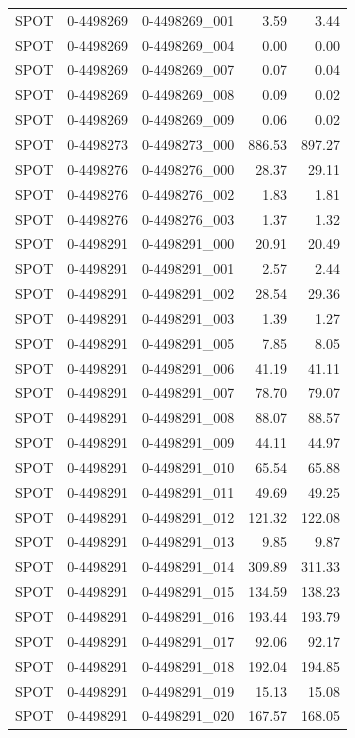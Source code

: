 \begin{tabular}{lllrr}
SPOT & 0-4498269 & 0-4498269_001 & 3.59 & 3.44 \\
SPOT & 0-4498269 & 0-4498269_004 & 0.00 & 0.00 \\
SPOT & 0-4498269 & 0-4498269_007 & 0.07 & 0.04 \\
SPOT & 0-4498269 & 0-4498269_008 & 0.09 & 0.02 \\
SPOT & 0-4498269 & 0-4498269_009 & 0.06 & 0.02 \\
SPOT & 0-4498273 & 0-4498273_000 & 886.53 & 897.27 \\
SPOT & 0-4498276 & 0-4498276_000 & 28.37 & 29.11 \\
SPOT & 0-4498276 & 0-4498276_002 & 1.83 & 1.81 \\
SPOT & 0-4498276 & 0-4498276_003 & 1.37 & 1.32 \\
SPOT & 0-4498291 & 0-4498291_000 & 20.91 & 20.49 \\
SPOT & 0-4498291 & 0-4498291_001 & 2.57 & 2.44 \\
SPOT & 0-4498291 & 0-4498291_002 & 28.54 & 29.36 \\
SPOT & 0-4498291 & 0-4498291_003 & 1.39 & 1.27 \\
SPOT & 0-4498291 & 0-4498291_005 & 7.85 & 8.05 \\
SPOT & 0-4498291 & 0-4498291_006 & 41.19 & 41.11 \\
SPOT & 0-4498291 & 0-4498291_007 & 78.70 & 79.07 \\
SPOT & 0-4498291 & 0-4498291_008 & 88.07 & 88.57 \\
SPOT & 0-4498291 & 0-4498291_009 & 44.11 & 44.97 \\
SPOT & 0-4498291 & 0-4498291_010 & 65.54 & 65.88 \\
SPOT & 0-4498291 & 0-4498291_011 & 49.69 & 49.25 \\
SPOT & 0-4498291 & 0-4498291_012 & 121.32 & 122.08 \\
SPOT & 0-4498291 & 0-4498291_013 & 9.85 & 9.87 \\
SPOT & 0-4498291 & 0-4498291_014 & 309.89 & 311.33 \\
SPOT & 0-4498291 & 0-4498291_015 & 134.59 & 138.23 \\
SPOT & 0-4498291 & 0-4498291_016 & 193.44 & 193.79 \\
SPOT & 0-4498291 & 0-4498291_017 & 92.06 & 92.17 \\
SPOT & 0-4498291 & 0-4498291_018 & 192.04 & 194.85 \\
SPOT & 0-4498291 & 0-4498291_019 & 15.13 & 15.08 \\
SPOT & 0-4498291 & 0-4498291_020 & 167.57 & 168.05 \\

\end{tabular}
